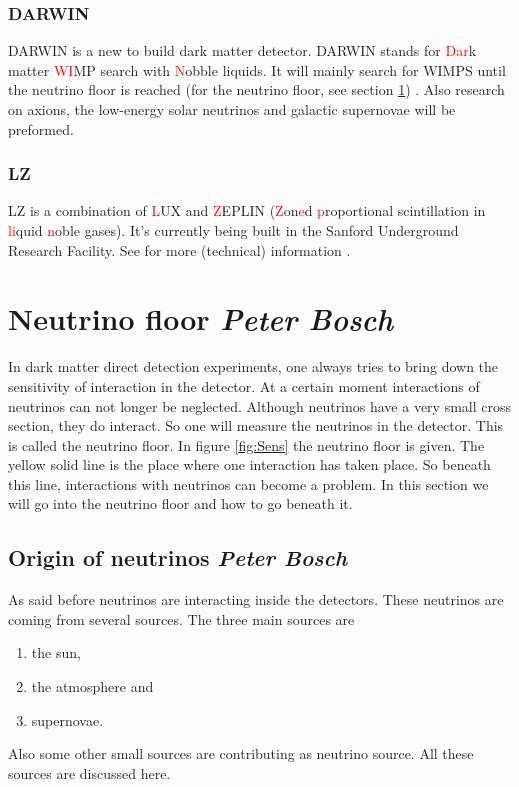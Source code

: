 \documentclass{article}
\begin{document}

\subsubsection{DARWIN}
DARWIN is a new to build dark matter detector. DARWIN stands for \textcolor{red}{Dar}k matter \textcolor{red}{WI}MP search with \textcolor{red}{N}obble liquids. It will mainly search for WIMPS until the neutrino floor is reached (for the neutrino floor, see section \ref{sec:floor}) \cite{Aalbers:2016jon}. Also research on axions, the low-energy solar neutrinos and galactic supernovae will be preformed.

\subsubsection{LZ}
LZ is a combination of \textcolor{red}{L}UX and \textcolor{red}{Z}EPLIN (\textcolor{red}{Z}on\textcolor{red}{e}d \textcolor{red}{p}roportional scintillation in \textcolor{red}{li}quid \textcolor{red}{n}oble gases). It's currently being built in the Sanford Underground Research Facility. See for more (technical) information \cite{Akerib:2015cja,Mount:2017qzi}.


 

\FloatBarrier
\section{Neutrino floor \small{\textit{Peter Bosch}}}
\label{sec:floor}
In dark matter direct detection experiments, one always tries to bring down the sensitivity of interaction in the detector. At a certain moment interactions of neutrinos can not longer be neglected. Although neutrinos have a very small cross section, they do interact. So one will measure the neutrinos in the detector. This is called the neutrino floor. In figure \ref{fig:Sens} the neutrino floor is given. The yellow solid line is the place where one interaction has taken place. So beneath this line, interactions with neutrinos can become a problem. In this section we will go into the neutrino floor and how to go beneath it.

\subsection{Origin of neutrinos \small{\textit{Peter Bosch}}}
As said before neutrinos are interacting inside the detectors. These neutrinos are coming from several sources. The three main sources are
\begin{enumerate}
    \item the sun,
    \item the atmosphere and
    \item supernovae.
\end{enumerate}
Also some other small sources are contributing as neutrino source. All these sources are discussed here.
\end{document}

